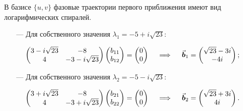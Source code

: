 \documentclass{article}
\begin{document}
В базисе $\{u,v\}$ фазовые траектории первого приближения имеют вид  логарифмических спиралей.
\vspace{0.1cm}
\begin{itemize}
    \item[---] Для собственного значения $\lambda_1 =  -5 + i\sqrt{23}$:
\end{itemize}
\begin{equation*}
    \begin{pmatrix}
     3 - i\sqrt{23} & -8 \\ 4 & -3 - i\sqrt{23}
    \end{pmatrix}
    \begin{pmatrix}
    b_{11} \\ b_{12}
    \end{pmatrix} = 
    \begin{pmatrix}
    0 \\ 0
    \end{pmatrix} \quad \implies \quad \va*{b}_1 = 
    \begin{pmatrix}
    \sqrt{23}-3i \\ -4i
    \end{pmatrix};
\end{equation*} \vspace{-0.1cm}
\begin{itemize}
    \item[---] Для собственного значения $\lambda_2 =  -5 - i\sqrt{23}$:
\end{itemize}
\begin{equation*}
    \begin{pmatrix}
     3 + i\sqrt{23} & -8 \\ 4 & -3 + i\sqrt{23}
    \end{pmatrix}
    \begin{pmatrix}
    b_{21} \\ b_{22}
    \end{pmatrix} = 
    \begin{pmatrix}
    0 \\ 0
    \end{pmatrix} \quad \implies \quad \va*{b}_2 = 
    \begin{pmatrix}
    \sqrt{23}+3i \\ 4i
    \end{pmatrix}.
\end{equation*}\vspace{0.4cm}\\ \indent
\end{document}
